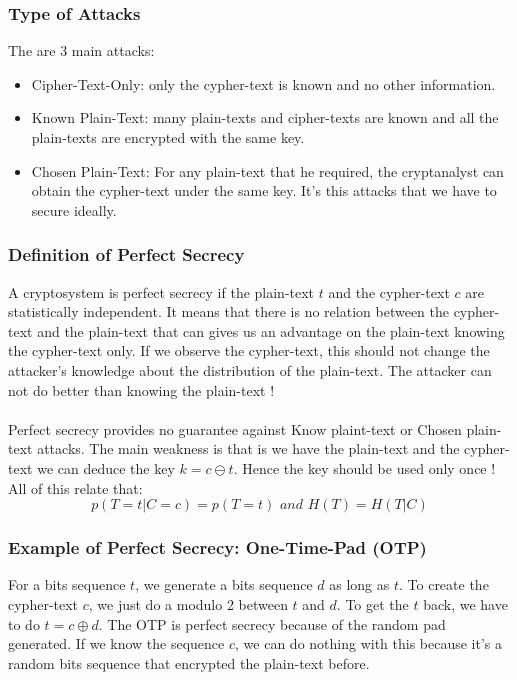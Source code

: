 \documentclass{article}
\begin{document}
\subsubsection{Type of Attacks} The are 3 main attacks:
\begin{itemize}
\item Cipher-Text-Only: only the cypher-text is known and no other information.
\item Known Plain-Text: many plain-texts and cipher-texts are known and all the plain-texts are encrypted with the same key.
\item Chosen Plain-Text: For any plain-text that he required, the cryptanalyst can obtain the cypher-text under the same key. It's this attacks that we have to secure ideally.
\end{itemize} 

\subsubsection{Definition of Perfect Secrecy} A cryptosystem is perfect secrecy if the plain-text $ t $ and the cypher-text $ c $ are statistically independent. It means that there is no relation between the cypher-text and the plain-text that can gives us an advantage on the plain-text knowing the cypher-text only. If we observe the cypher-text, this should not change the attacker's knowledge about the distribution of the plain-text. The attacker can not do better than knowing the plain-text !
\\
\\
Perfect secrecy provides no guarantee against Know plaint-text or Chosen plain-text attacks. The main weakness is that is we have the plain-text and the cypher-text we can deduce the key $ k = c \ominus t $. Hence the key should be used only once ! All of this relate that:
\begin{equation}
p(T = t | C = c) = p(T = t) \textit{  and  } H(T) = H(T | C)
\end{equation}

\subsubsection{Example of Perfect Secrecy: One-Time-Pad (OTP)} For a bits sequence $ t $, we generate a bits sequence $ d $ as long as $ t $. To create the cypher-text $ c $, we just do a modulo 2 between $ t $ and $ d $. To get the $ t $ back, we have to do $ t = c \oplus d $. The OTP is perfect secrecy because of the random pad generated. If we know the sequence $ c $, we can do nothing with this because it's a random bits sequence that encrypted the plain-text before.
\end{document}
